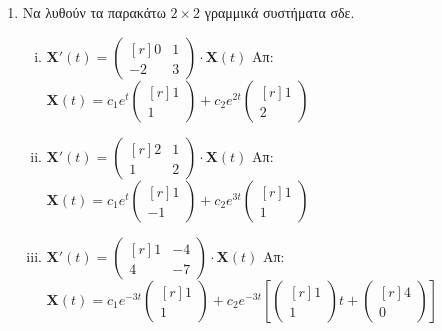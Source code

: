 


\pagestyle{askhseis}



\begin{center}
  \minibox{\large \bfseries \textcolor{Col1}{Ασκήσεις στα Γραμμικά Συστήματα ΣΔΕ
  (Ομογενή)}}
\end{center}

\vspace{\baselineskip}


\begin{enumerate}

	\item Να λυθούν τα παρακάτω $ 2 \times 2 $ γραμμικά συστήματα σδε.

		\begin{enumerate}[i)]

			\item $ \mathbf{X}'(t) = 
				\begin{pmatrix*}[r]
					0 & 1 \\
					-2 & 3
				\end{pmatrix*} \cdot 
				\mathbf{X}(t) $
				\hfill Απ: {\scriptsize $ \mathbf{X}(t) = c_{1}e^{t} 
				\begin{pmatrix*}[r] 1 \\ 1 \end{pmatrix*} + c_{2}e^{2t} 
			\begin{pmatrix*}[r] 1 \\ 2 \end{pmatrix*} $} 

			\item $ \mathbf{X}'(t) = 
				\begin{pmatrix*}[r]
					2 & 1 \\
					1 & 2
				\end{pmatrix*} \cdot 
				\mathbf{X}(t) $
				\hfill Απ: {\scriptsize $ \mathbf{X}(t) = c_{1}e^{t} 
				\begin{pmatrix*}[r] 1 \\ -1 \end{pmatrix*} + c_{2}e^{3t} 
			\begin{pmatrix*}[r] 1 \\ 1 \end{pmatrix*} $} 

		\item $ \mathbf{X}'(t) = 
			\begin{pmatrix*}[r]
				1 & -4 \\
				4 & -7
			\end{pmatrix*} \cdot
			\mathbf{X}(t) $ 
			\hfill Απ: {\scriptsize $ \mathbf{X}(t) = c_{1}e^{-3t} 
			\begin{pmatrix*}[r] 1 \\ 1 \end{pmatrix*} + c_{2}e^{-3t} \left[
			\begin{pmatrix*}[r] 1 \\ 1 \end{pmatrix*} t + 
	\begin{pmatrix*}[r] 4 \\ 0 \end{pmatrix*}  \right] $}


\end{enumerate}
\end{enumerate}
